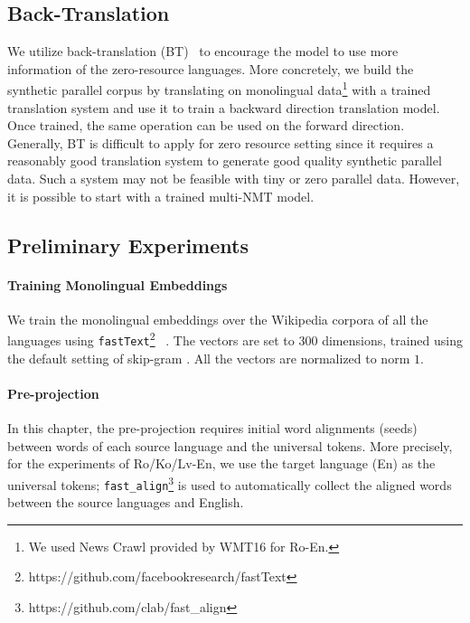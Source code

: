 \subsection{Back-Translation}
We utilize back-translation (BT)~\cite{sennrich2016edinburgh} to encourage the model to use more information of the zero-resource languages. More concretely, we build the synthetic parallel corpus by translating on monolingual data\footnote{We used News Crawl provided by WMT16 for Ro-En.} with a trained translation system and use it to train a backward direction translation model. Once trained, the same operation can be used on the forward direction. 
Generally, BT is difficult to apply for zero resource setting since it requires a reasonably good translation system to generate good quality synthetic parallel data. Such a system may not be feasible with tiny or zero parallel data. However, it is possible to start with a trained multi-NMT model.

\subsection{Preliminary Experiments}
\paragraph{Training Monolingual Embeddings} We train the monolingual embeddings  over the Wikipedia corpora of all the languages using \texttt{fastText}\footnote{https://github.com/facebookresearch/fastText}~\cite{bojanowski2016enriching} .  The vectors are set to 300 dimensions, trained using the default setting of skip-gram . All the vectors are normalized to norm $1$.

\paragraph{Pre-projection} In this chapter, the pre-projection requires initial word alignments (seeds) between words of each source language and the universal tokens.  More precisely, for the experiments of Ro/Ko/Lv-En, we use the target language (En) as the universal tokens;  \texttt{fast\_align}\footnote{https://github.com/clab/fast\_align} is used to automatically collect the aligned words between the source languages and English. %

